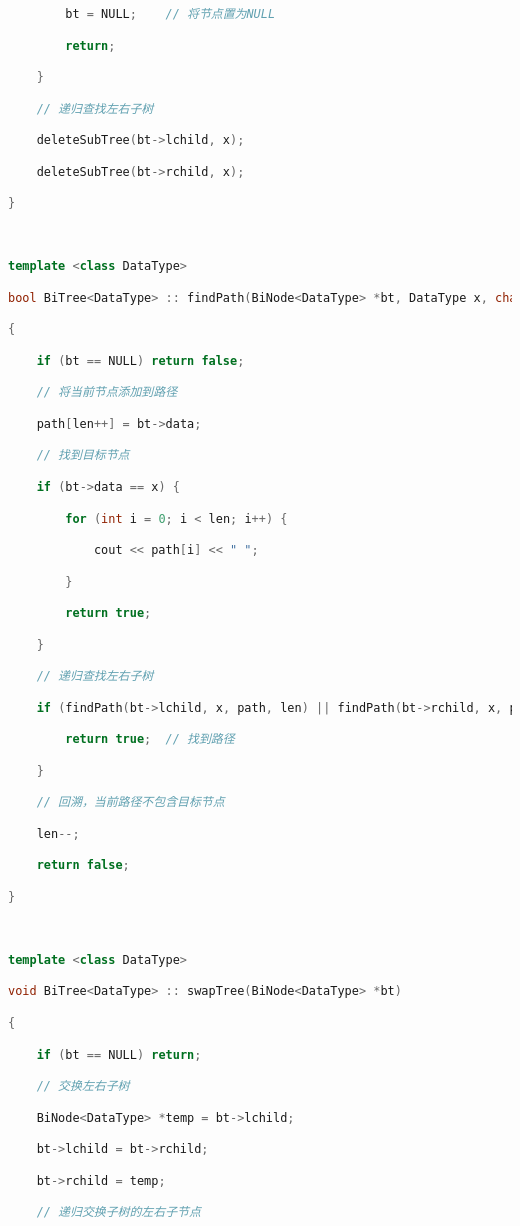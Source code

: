 \begin{lstlisting}[language=C++]
        bt = NULL;    // 将节点置为NULL

        return;

    }

    // 递归查找左右子树

    deleteSubTree(bt->lchild, x);

    deleteSubTree(bt->rchild, x);

}

  

template <class DataType>

bool BiTree<DataType> :: findPath(BiNode<DataType> *bt, DataType x, char path[], int &len)

{

    if (bt == NULL) return false;

    // 将当前节点添加到路径

    path[len++] = bt->data;

    // 找到目标节点

    if (bt->data == x) {

        for (int i = 0; i < len; i++) {

            cout << path[i] << " ";

        }

        return true;

    }

    // 递归查找左右子树

    if (findPath(bt->lchild, x, path, len) || findPath(bt->rchild, x, path, len)) {

        return true;  // 找到路径

    }

    // 回溯，当前路径不包含目标节点

    len--;

    return false;

}

  

template <class DataType>

void BiTree<DataType> :: swapTree(BiNode<DataType> *bt)

{

    if (bt == NULL) return;

    // 交换左右子树

    BiNode<DataType> *temp = bt->lchild;

    bt->lchild = bt->rchild;

    bt->rchild = temp;

    // 递归交换子树的左右子节点


\end{lstlisting}
